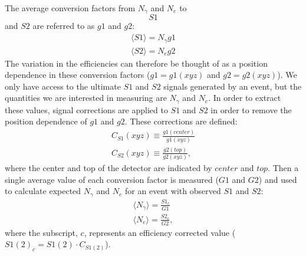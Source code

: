 The average conversion factors from $N_{\gamma}$ and $N_e$ to $$S1$$ and $S2$ are referred to as $g1$ and $g2$:
\begin{equation}\label{eq:krypcal1}
\begin{split}
\langle S1 \rangle = N_{\gamma}g1\\
\langle S2 \rangle = N_e g2
\end{split}
\end{equation}
The variation in the efficiencies can therefore be thought of as a position dependence in these conversion factors ($g1=g1(xyz)$ and $g2=g2(xyz)$). We only have access to the ultimate $S1$ and $S2$ signals generated by an event, but the quantities we are interested in measuring are $N{_\gamma}$ and $N_e$. In order to extract these values, signal corrections are applied to $S1$ and $S2$ in order to remove the position dependence of $g1$ and $g2$. These corrections are defined:
\begin{equation}\label{eq:krypcal2}
\begin{split}
C_{S1}(xyz) \equiv \frac{g1(center)}{g1(xyz)}\\[1em]
C_{S2}(xyz)\equiv \frac{g2(top)}{g2(xyz)},
\end{split}
\end{equation}
where the center and top of the detector are indicated by $center$ and $top$. Then a single average value of each conversion factor is measured ($G1$ and $G2$) and used to calculate expected $N_{\gamma}$ and $N_e$ for an event with observed $S1$ and $S2$:
\begin{equation}
\begin{split}
\langle N_{\gamma} \rangle = \frac{S1_c}{G1}\\[1em]
\langle N_e \rangle = \frac{S2_c}{G2},
\end{split}
\end{equation}
where the subscript, $c$, represents an efficiency corrected value ($S1(2)_c=S1(2)\cdot C_{S1(2)}$).

